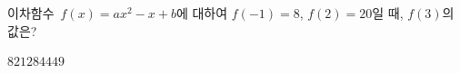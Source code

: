 이차함수~$f(x)=ax^2-x+b$에 대하여 $f(-1)=8$, $f(2)=20$일 때, $f(3)$의 값은?
\begin{choices32}{$8$}{$21$}{$28$}{$44$}{$49$}\end{choices32}
